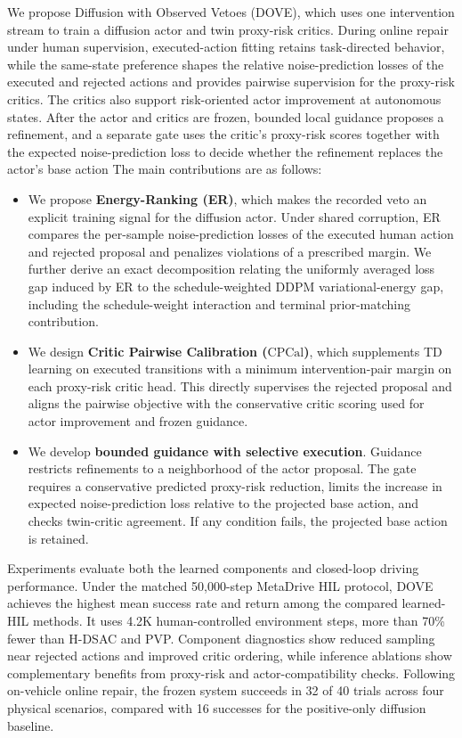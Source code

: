\documentclass[9pt,journal]{IEEEtran}
\newcommand{\DOVE}{DOVE}
\newcommand{\CPCal}{\ensuremath{\mathrm{CPCal}}}
\begin{document}
We propose Diffusion with Observed Vetoes (\DOVE{}), which uses one
intervention stream to train a diffusion actor and twin proxy-risk
critics. During online repair under human supervision, executed-action
fitting retains task-directed behavior, while the same-state preference shapes the relative noise-prediction
losses of the executed and rejected actions and provides pairwise
supervision for the proxy-risk critics.
The critics also support risk-oriented actor improvement at autonomous
states. After the actor and critics are frozen, bounded local guidance
proposes a refinement, and a separate gate uses the critic's proxy-risk scores together with
the expected noise-prediction loss to decide whether the refinement
replaces the actor's base action The main
contributions are as follows:
\begin{itemize}
   \item We propose \textbf{Energy-Ranking (ER)}, which makes the
recorded veto an explicit training signal for the diffusion actor.
Under shared corruption, ER compares the per-sample noise-prediction
losses of the executed human action and rejected proposal and
penalizes violations of a prescribed margin. We further derive an
exact decomposition relating the uniformly averaged loss gap
induced by ER to the schedule-weighted DDPM variational-energy gap,
including the schedule-weight interaction and terminal
prior-matching contribution.

    \item We design \textbf{Critic Pairwise Calibration (\CPCal{})},
    which supplements TD learning on executed transitions with a minimum
    intervention-pair margin on each proxy-risk critic head. This
    directly supervises the rejected proposal and aligns the pairwise
    objective with the conservative critic scoring used for actor
    improvement and frozen guidance.

    \item We develop \textbf{bounded guidance with selective execution}.
    Guidance restricts refinements to a neighborhood of the actor
    proposal. The gate requires a conservative predicted proxy-risk reduction,
limits the increase in expected noise-prediction loss relative to
the projected base action, and checks twin-critic agreement. If any
    condition fails, the projected base action is retained.
\end{itemize}

Experiments evaluate both the learned components and closed-loop driving
performance. Under the matched 50{,}000-step MetaDrive HIL protocol,
\DOVE{} achieves the highest mean success rate  and return
among the compared learned-HIL methods. It uses 4.2K human-controlled
environment steps, more than 70\% fewer than H-DSAC and PVP. Component
diagnostics show reduced sampling near rejected actions and improved
critic ordering, while inference ablations show complementary benefits
from proxy-risk and actor-compatibility checks. Following on-vehicle
online repair, the frozen system succeeds in 32 of 40 trials across four
physical scenarios, compared with 16 successes for the positive-only
diffusion baseline.
\end{document}
